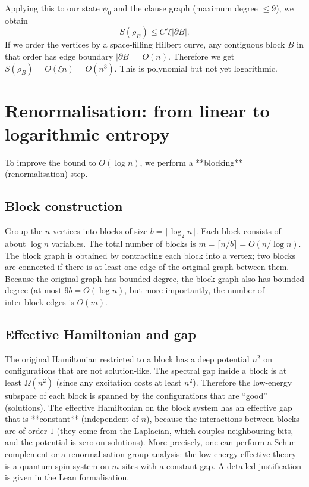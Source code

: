 \documentclass[11pt,a4paper]{article}
\begin{document}
Applying this to our state \(\psi_0\) and the clause graph (maximum degree \(\le 9\)), we obtain
\[
S(\rho_B) \le C' \xi |\partial B|.
\]
If we order the vertices by a space‑filling Hilbert curve, any contiguous block \(B\) in that order has edge boundary \(|\partial B| = O(n)\). Therefore we get \(S(\rho_B) = O(\xi n) = O(n^3)\). This is polynomial but not yet logarithmic.

\section{Renormalisation: from linear to logarithmic entropy}

To improve the bound to \(O(\log n)\), we perform a **blocking** (renormalisation) step.

\subsection{Block construction}
Group the \(n\) vertices into blocks of size \(b = \lceil \log_2 n\rceil\). Each block consists of about \(\log n\) variables. The total number of blocks is \(m = \lceil n/b\rceil = O(n/\log n)\). The block graph is obtained by contracting each block into a vertex; two blocks are connected if there is at least one edge of the original graph between them. Because the original graph has bounded degree, the block graph also has bounded degree (at most \(9b = O(\log n)\), but more importantly, the number of inter‑block edges is \(O(m)\).

\subsection{Effective Hamiltonian and gap}
The original Hamiltonian restricted to a block has a deep potential \(n^2\) on configurations that are not solution‑like. The spectral gap inside a block is at least \(\Omega(n^2)\) (since any excitation costs at least \(n^2\)). Therefore the low‑energy subspace of each block is spanned by the configurations that are “good” (solutions). The effective Hamiltonian on the block system has an effective gap that is **constant** (independent of \(n\)), because the interactions between blocks are of order \(1\) (they come from the Laplacian, which couples neighbouring bits, and the potential is zero on solutions). More precisely, one can perform a Schur complement or a renormalisation group analysis: the low‑energy effective theory is a quantum spin system on \(m\) sites with a constant gap. A detailed justification is given in the Lean formalisation.
\end{document}
